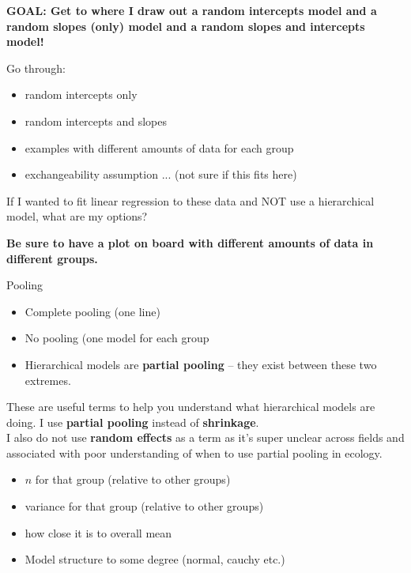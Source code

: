\documentclass[11pt]{article}
\begin{document}

{\bf GOAL: Get to where I draw out a random intercepts model and a random slopes (only) model and a random slopes and intercepts model!}

Go through:
\begin{itemize}
\item random intercepts only
\item random intercepts and slopes
\item examples with different amounts of data for each group
\item exchangeability assumption ... (not sure if this fits here)
\end{itemize}

If I wanted to fit  linear regression to these data and NOT use a hierarchical model, what are my options?

{\bf Be sure to have a plot on board with different amounts of data in different groups.}

{\Large Pooling} %
\begin{itemize}
\item Complete pooling (one line)
\item No pooling (one model for each group
\item Hierarchical models are {\bf partial pooling} -- they exist between these two extremes. 
\end{itemize}

These are useful terms to help you understand what hierarchical models are doing. I use {\bf partial pooling} instead of {\bf shrinkage}. \\
I also do not use {\bf random effects} as a term as it's super unclear across fields and associated with poor understanding of when to use partial pooling in ecology.


\begin{itemize}
\item $n$ for that group (relative to other groups)
\item variance for that group (relative to other groups)
\item how close it is to overall mean 
\item Model structure to some degree (normal, cauchy etc.)
\end{itemize}
\end{document}
